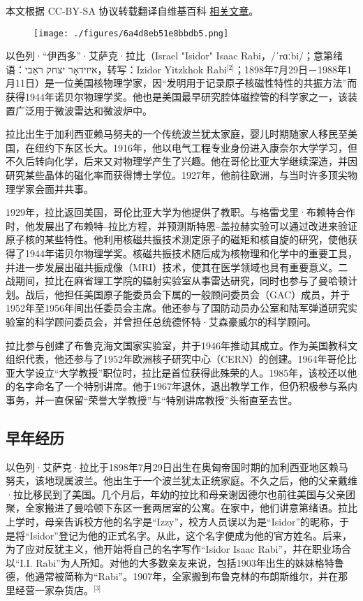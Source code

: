 
本文根据 CC-BY-SA 协议转载翻译自维基百科 \href{https://en.wikipedia.org/wiki/Isidor_Isaac_Rabi}{相关文章}。

\begin{figure}[ht]
\centering
\texttt{[image: ./figures/6a4d8eb51e8bbdb5.png]}
\caption{} \label{fig_YXDlb_1}
\end{figure}
以色列·“伊西多”·艾萨克·拉比（Israel "Isidor" Isaac Rabi，/ˈrɑːbi/；意第绪语：איזידאָר יצחק ראַבי，转写：Izidor Yitzkhok Rabi\(^\text{[2]}\)；1898年7月29日－1988年1月11日）是一位美国核物理学家，因“发明用于记录原子核磁性特性的共振方法”而获得1944年诺贝尔物理学奖。他也是美国最早研究腔体磁控管的科学家之一，该装置广泛用于微波雷达和微波炉中。

拉比出生于加利西亚赖马努夫的一个传统波兰犹太家庭，婴儿时期随家人移民至美国，在纽约下东区长大。1916年，他以电气工程专业身份进入康奈尔大学学习，但不久后转向化学，后来又对物理学产生了兴趣。他在哥伦比亚大学继续深造，并因研究某些晶体的磁化率而获得博士学位。1927年，他前往欧洲，与当时许多顶尖物理学家会面并共事。

1929年，拉比返回美国，哥伦比亚大学为他提供了教职。与格雷戈里·布赖特合作时，他发展出了布赖特–拉比方程，并预测斯特恩–盖拉赫实验可以通过改进来验证原子核的某些特性。他利用核磁共振技术测定原子的磁矩和核自旋的研究，使他获得了1944年诺贝尔物理学奖。核磁共振技术随后成为核物理和化学中的重要工具，并进一步发展出磁共振成像（MRI）技术，使其在医学领域也具有重要意义。二战期间，拉比在麻省理工学院的辐射实验室从事雷达研究，同时也参与了曼哈顿计划。战后，他担任美国原子能委员会下属的一般顾问委员会（GAC）成员，并于1952年至1956年间出任委员会主席。他还参与了国防动员办公室和陆军弹道研究实验室的科学顾问委员会，并曾担任总统德怀特·艾森豪威尔的科学顾问。

拉比参与创建了布鲁克海文国家实验室，并于1946年推动其成立。作为美国教科文组织代表，他还参与了1952年欧洲核子研究中心（CERN）的创建。1964年哥伦比亚大学设立“大学教授”职位时，拉比是首位获得此殊荣的人。1985年，该校还以他的名字命名了一个特别讲席。他于1967年退休，退出教学工作，但仍积极参与系内事务，并一直保留“荣誉大学教授”与“特别讲席教授”头衔直至去世。
\subsection{早年经历}
以色列·艾萨克·拉比于1898年7月29日出生在奥匈帝国时期的加利西亚地区赖马努夫，该地现属波兰。他出生于一个波兰犹太正统家庭。不久之后，他的父亲戴维·拉比移民到了美国。几个月后，年幼的拉比和母亲谢因德尔也前往美国与父亲团聚，全家搬进了曼哈顿下东区一套两居室的公寓。在家中，他们讲意第绪语。拉比上学时，母亲告诉校方他的名字是“Izzy”，校方人员误以为是“Isidor”的昵称，于是将“Isidor”登记为他的正式名字。从此，这个名字便成为他的官方姓名。后来，为了应对反犹主义，他开始将自己的名字写作“Isidor Isaac Rabi”，并在职业场合以“I.I. Rabi”为人所知。对他的大多数亲友来说，包括1903年出生的妹妹格特鲁德，他通常被简称为“Rabi”。1907年，全家搬到布鲁克林的布朗斯维尔，并在那里经营一家杂货店。\(^\text{[3]}\)

